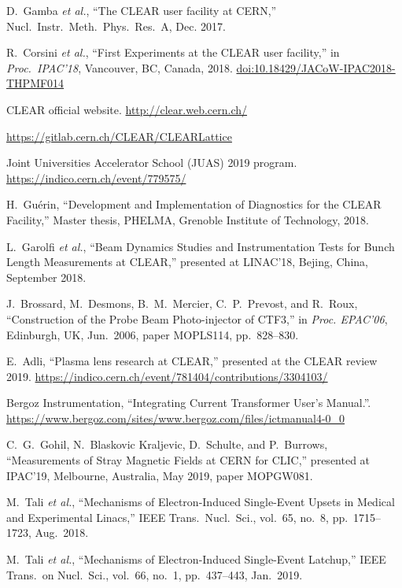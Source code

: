 \documentclass[a4paper,
               keeplastbox,   %
               ]{jacow}
\begin{document}
\begin{thebibliography}{99}
 D.\ Gamba \emph{et al.}, “The CLEAR user facility at CERN,” Nucl.\ Instr.\ Meth.\ Phys.\ Res.\ A, Dec. 2017.

 R.\ Corsini \emph{et al.}, “First Experiments at the CLEAR user facility,” in \emph{Proc.\ IPAC'18}, Vancouver, BC, Canada, 2018. \url{doi:10.18429/JACoW-IPAC2018-THPMF014}

 CLEAR official website. \url{http://clear.web.cern.ch/}

 \url{https://gitlab.cern.ch/CLEAR/CLEARLattice}

 Joint Universities Accelerator School (JUAS) 2019 program. \url{https://indico.cern.ch/event/779575/}

 H.\ Guérin, “Development and Implementation of Diagnostics for the CLEAR Facility,” Master thesis, PHELMA, Grenoble Institute of Technology, 2018.

 L.\ Garolfi \emph{et al.}, “Beam Dynamics Studies and Instrumentation Tests for Bunch Length Measurements at CLEAR,” presented at LINAC'18, Bejing, China, September 2018.

 J.\ Brossard, M.\ Desmons, B.\ M.\ Mercier, C.\ P.\ Prevost, and R.\ Roux, “Construction of the Probe Beam Photo-injector of CTF3,” in \emph{Proc. EPAC'06}, Edinburgh, UK, Jun.\ 2006, paper MOPLS114, pp.\ 828--830.

 E.\ Adli, ``Plasma lens research at CLEAR,'' presented at the CLEAR review 2019. \url{https://indico.cern.ch/event/781404/contributions/3304103/}

 Bergoz Instrumentation, “Integrating Current Transformer User’s Manual.”. \url{https://www.bergoz.com/sites/www.bergoz.com/files/ictmanual4-0_0}

   C.\ G.\ Gohil, N.\ Blaskovic Kraljevic, D.\ Schulte, and P.\ Burrows,
   “Measurements of Stray Magnetic Fields at CERN for CLIC,”
   presented at IPAC'19, Melbourne, Australia, May 2019, paper MOPGW081.

 M.\ Tali \emph{et al.}, “Mechanisms of Electron-Induced Single-Event Upsets in Medical and Experimental Linacs,” IEEE Trans.\ Nucl.\ Sci., vol.\ 65, no.\ 8, pp.\ 1715--1723, Aug.\ 2018.

 M.\ Tali \emph{et al.}, “Mechanisms of Electron-Induced Single-Event Latchup,” IEEE Trans.\ on Nucl.\ Sci., vol.\ 66, no.\ 1, pp.\ 437--443, Jan.\ 2019.


\end{thebibliography}
\end{document}

